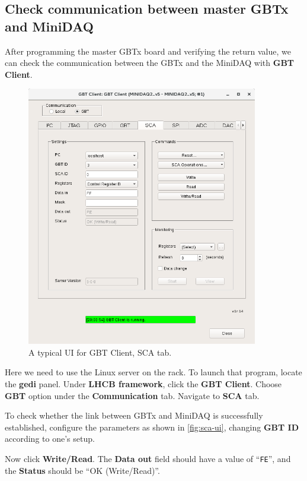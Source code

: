 \subsection{Check communication between master GBTx and MiniDAQ}
After programming the master GBTx board and verifying the return value, we can check
the communication between the GBTx and the MiniDAQ with \textbf{GBT Client}.

\begin{figure}[ht]
    \centering
    \includegraphics[width=0.9\textwidth]{res/gbt_client_master_gbt_sca_test.png}
    \caption{A typical UI for GBT Client, SCA tab.}
    \label{fig:sca-ui}
\end{figure}

Here we need to use the Linux server on the rack.
To launch that program, locate the \textbf{gedi} panel. Under
\textbf{LHCB framework},
click the \textbf{GBT Client}.
Choose \textbf{GBT} option under the \textbf{Communication} tab.
Navigate to \textbf{SCA} tab.

To check whether the link between GBTx and MiniDAQ is successfully established,
configure the parameters as shown in \autoref{fig:sca-ui},
changing \textbf{GBT ID} according to one's setup.

Now click \textbf{Write/Read}.
The \textbf{Data out} field should have a value of ``\texttt{FE}'', and the
\textbf{Status} should be ``OK (Write/Read)''.

